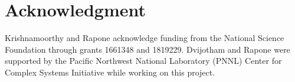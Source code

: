\section*{Acknowledgment}

Krishnamoorthy and Rapone acknowledge funding from the National Science Foundation through grants 1661348 and 1819229.
Dvijotham and Rapone were supported by the Pacific Northwest National Laboratory (PNNL) Center for Complex Systems Initiative while working on this project. 
